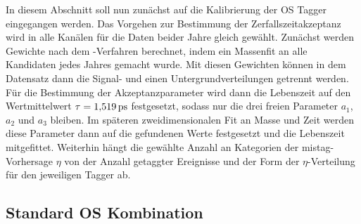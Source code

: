 In diesem Abschnitt soll nun zunächst auf die Kalibrierung der OS Tagger eingegangen werden. Das Vorgehen zur Bestimmung der Zerfallszeitakzeptanz wird in alle Kanälen für die Daten beider Jahre gleich gewählt. Zunächst werden Gewichte nach dem \sPlot-Verfahren \cite{splot} berechnet, indem ein Massenfit an alle Kandidaten jedes Jahres gemacht wurde. Mit diesen Gewichten können in dem Datensatz dann die Signal- und einen Untergrundverteilungen getrennt werden. Für die Bestimmung der Akzeptanzparameter wird dann die Lebenszeit auf den Wertmittelwert $\tau=\SI{1{,}519}{ps}$ \cite{PDG-2012} festgesetzt, sodass nur die drei freien Parameter $a_1$, $a_2$ und $a_3$ bleiben. Im späteren zweidimensionalen Fit an Masse und Zeit werden diese Parameter dann auf die gefundenen Werte festgesetzt und die Lebenszeit mitgefittet. Weiterhin hängt die gewählte Anzahl an Kategorien der mistag-Vorhersage $\eta$ von der Anzahl getaggter Ereignisse und der Form der $\eta$-Verteilung für den jeweiligen Tagger ab.

\subsection{Standard OS Kombination}\label{sec:OSkalib}

